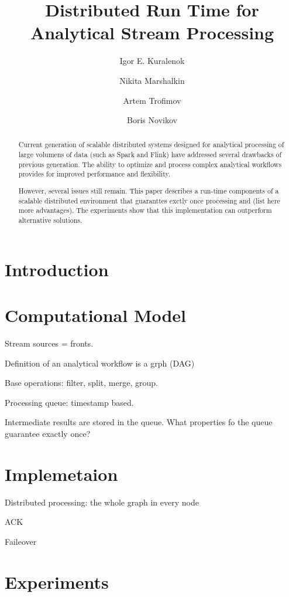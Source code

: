 \documentclass {article}
\begin{document}
\title {Distributed Run Time for Analytical Stream Processing}
\author {Igor E. Kuralenok \and Nikita Marshalkin \and Artem Trofimov \and Boris Novikov}
\maketitle

\begin{abstract}
Current generation of scalable distributed systems designed for analytical processing of large volumens of data (such as  Spark and Flink) have addressed several drawbacks of previous generation. The ability to optimize and process complex analytical workflows  provides for improved performance and flexibility.

However, several issues still remain. This paper describes a run-time components of a scalable distributed environment that guaranttes exctly once  processing and (list here more advantages). The experiments show that this implementation can outperform alternative solutions.
\end {abstract}

\section {Introduction}

\section {Computational Model}

Stream sources = fronts. 

Definition of an analytical workflow is a grph (DAG)

Base operations: filter, split, merge, group. 

Processing queue: timestamp based. 

Intermediate results are stored in the queue. What properties fo the queue guarantee exactly once?

\section {Implemetaion}

Distributed processing: the whole graph in every node

ACK

Faileover

\section {Experiments}
\end{document}
